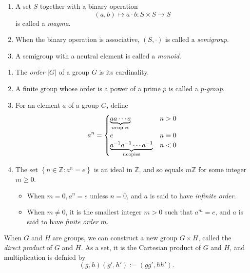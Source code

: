 \begin{definition}
  \begin{enumerate}
    \item A set \( S \) together with a binary operation
      \[
        (a, b) \mapsto a \cdot b: S \times S \to S
      \]
      is called a \emph{magma}.
    \item When the binary operation is associative, \( (S, \cdot) \) is called a \emph{semigroup}.
    \item A semigroup with a neutral element is called a \emph{monoid}.
  \end{enumerate}
\end{definition}

\begin{definition}
  \begin{enumerate}
    \item The \emph{order} \( \left\vert G \right\vert \) of a group \( G \) is its cardinality.
    \item A finite group whose order is a power of a prime \( p \) is called a \emph{\( p \)-group}.
    \item For an element \( a \) of a group \( G \), define
      \[
        a^n = \begin{cases}
          \underbrace{a a \cdots a}_{n \textmd{copies}} & n > 0\\
          e & n = 0\\ 
          \underbrace{a^{-1} a^{-1} \cdots a^{-1}}_{n \textmd{copies}} & n < 0
        \end{cases}
      \]
    \item The set \( \left\lbrace n \in \mathbb{Z}: a^n = e \right\rbrace \) is an ideal in \( \mathbb{Z} \), and so equals \( m \mathbb{Z} \) for some integer \( m \geq 0 \).
      \begin{itemize}
        \item When \( m = 0, a^n = e  \) unless \( n = 0 \), and \( a \) is said to have \emph{infinite order}.
        \item When \( m \neq 0 \), it is the smallest integer \( m > 0 \) such that \( a^m = e \), and \( a \) is said to have \emph{finite order} \( m \).
      \end{itemize}
  \end{enumerate}
\end{definition}

\begin{definition}
  When \( G \) and \( H \) are  groups, we can construct a new group \( G \times H \), called the \emph{direct product} of \( G \) and \( H \).
  As a set, it is the Cartesian product of \( G \) and \( H \), and multiplication is defnied by
  \[
    (g, h)(g', h') := (gg', hh').
  \]
\end{definition}


